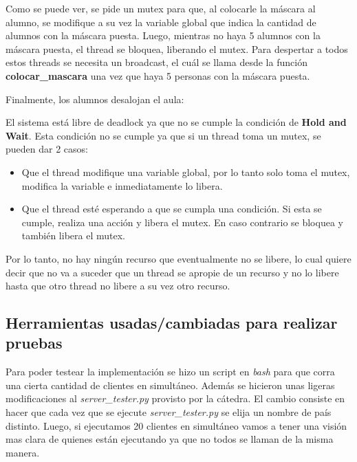 

Como se puede ver, se pide un mutex para que, al colocarle la m\'ascara al alumno, se modifique a su vez la variable global que indica la cantidad de alumnos con la m\'ascara puesta. Luego, mientras no haya 5 alumnos con la m\'ascara puesta, el 
thread se bloquea, liberando el mutex. Para despertar a todos estos threads se necesita un broadcast, el cu\'al se llama desde la funci\'on \textbf{colocar\_mascara} una vez que haya 5 personas con la 
m\'ascara puesta.



\newpage

Finalmente, los alumnos desalojan el aula:




El sistema est\'a libre de deadlock ya que no se cumple la condici\'on de \textbf{Hold and Wait}. Esta condici\'on no se cumple ya que si un thread toma un mutex,
se pueden dar 2 casos:

\begin{itemize}
 \item Que el thread modifique una variable global, por lo tanto solo toma el mutex, modifica la variable e inmediatamente lo libera.
 \item Que el thread est\'e esperando a que se cumpla una condici\'on. Si esta se cumple, realiza una acci\'on y libera el mutex. En caso contrario se bloquea y tambi\'en libera el mutex.
\end{itemize}

Por lo tanto, no hay ning\'un recurso que eventualmente no se libere, lo cual quiere decir que no va a suceder que un thread se apropie de un recurso y no lo libere hasta que otro thread
no libere a su vez otro recurso.



\subsection{Herramientas usadas/cambiadas para realizar pruebas}
Para poder testear la implementaci\'on se hizo un script en \emph{bash} para que corra una cierta cantidad de clientes en simult\'aneo. Adem\'as se hicieron unas ligeras modificaciones al \emph{server\_tester.py} provisto por la c\'atedra. El cambio consiste en hacer que cada vez que se ejecute \emph{server\_tester.py} se elija un nombre de pa\'is distinto. Luego, si ejecutamos 20 clientes en simult\'aneo vamos a tener una visi\'on mas clara de quienes est\'an ejecutando ya que no todos se llaman de la misma manera.

